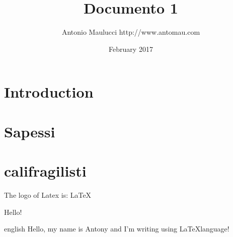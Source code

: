 \documentclass{article}
\title{Documento 1}
\author{Antonio Maulucci http://www.antomau.com}
\date{February 2017}
\begin{document}
\maketitle




\section{Introduction}
\section{Sapessi}
\section{califragilisti}

The logo of Latex is: \LaTeX


\foreignlanguage{english}{Hello!}

\begin{otherlanguage*}{english}
Hello, my name is Antony and I'm writing using \LaTeX language!
\end{otherlanguage*}
\end{document}
